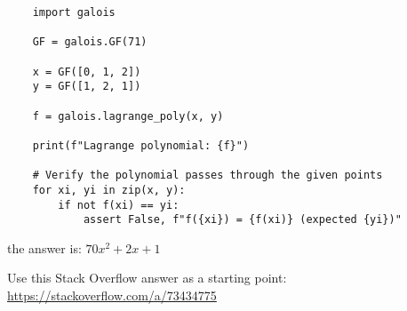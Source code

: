 \documentclass{article}
\begin{document}
\begin{lstlisting}
    import galois

    GF = galois.GF(71)

    x = GF([0, 1, 2])
    y = GF([1, 2, 1])

    f = galois.lagrange_poly(x, y)

    print(f"Lagrange polynomial: {f}")

    # Verify the polynomial passes through the given points
    for xi, yi in zip(x, y):
        if not f(xi) == yi:
            assert False, f"f({xi}) = {f(xi)} (expected {yi})"
\end{lstlisting}

the answer is: $70x^2 + 2x + 1$

Use this Stack Overflow answer as a starting point: \url{https://stackoverflow.com/a/73434775}
\end{document}
